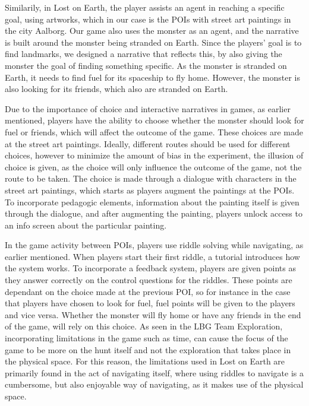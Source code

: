 Similarily, in Lost on Earth, the player assists an agent in reaching a specific goal, using artworks, which in our case is the POIs with street art paintings in the city Aalborg. Our game also uses the monster as an agent, and the narrative is built around the monster being stranded on Earth. Since the players' goal is to find landmarks, we designed a narrative that reflects this, by also giving the monster the goal of finding something specific. As the monster is stranded on Earth, it needs to find fuel for its spaceship to fly home. However, the monster is also looking for its friends, which also are stranded on Earth.

Due to the importance of choice and interactive narratives in games, as earlier mentioned, players have the ability to choose whether the monster should look for fuel or friends, which will affect the outcome of the game. These choices are made at the street art paintings. Ideally, different routes should be used for different choices, however to minimize the amount of bias in the experiment, the illusion of choice is given, as the choice will only influence the outcome of the game, not the route to be taken. The choice is made through a dialogue with characters in the street art paintings, which starts as players augment the paintings at the POIs. To incorporate pedagogic elements, information about the painting itself is given through the dialogue, and after augmenting the painting, players unlock access to an info screen about the particular painting. 

In the game activity between POIs, players use riddle solving while navigating, as earlier mentioned. When players start their first riddle, a tutorial introduces how the system works. To incorporate a feedback system, players are given points as they answer correctly on the control questions for the riddles. These points are dependant on the choice made at the previous POI, so for instance in the case that players have chosen to look for fuel, fuel points will be given to the players and vice versa. Whether the monster will fly home or have any friends in the end of the game, will rely on this choice. As seen in the LBG Team Exploration, incorporating limitations in the game such as time, can cause the focus of the game to be more on the hunt itself and not the exploration that takes place in the physical space. For this reason, the limitations used in Lost on Earth are primarily found in the act of navigating itself, where using riddles to navigate is a cumbersome, but also enjoyable way of navigating, as it makes use of the physical space.